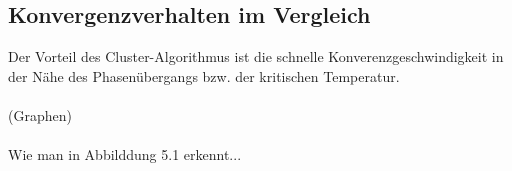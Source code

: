 \subsection{Konvergenzverhalten im Vergleich}
Der Vorteil des Cluster-Algorithmus ist die schnelle Konverenzgeschwindigkeit in der Nähe des Phasenübergangs bzw. der kritischen Temperatur.\\\\
(Graphen)\\\\
Wie man in Abbilddung 5.1 erkennt...\\